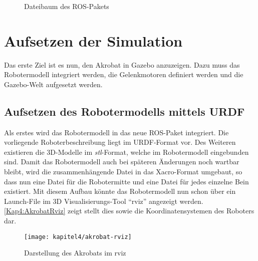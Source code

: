 \begin{figure}[p!]
\caption{Dateibaum des ROS-Pakets}
\label{Kap4:ROSPackageFolderStructure}
\end{figure}

\section{Aufsetzen der Simulation}

Das erste Ziel ist es nun, den Akrobat in Gazebo anzuzeigen. Dazu muss das Robotermodell integriert werden, die Gelenkmotoren definiert werden und die Gazebo-Welt aufgesetzt werden.

\subsection{Aufsetzen des Robotermodells mittels URDF}

Als erstes wird das Robotermodell in das neue \ac{ROS}-Paket integriert. Die vorliegende Roboterbeschreibung liegt im \ac{URDF}-Format vor. Des Weiteren existieren die 3D-Modelle im \emph{stl}-Format, welche im Robotermodell eingebunden sind. Damit das Robotermodell auch bei späteren Änderungen noch wartbar bleibt, wird die zusammenhängende Datei in das \ac{Xacro}-Format umgebaut, so dass nun eine Datei für die Robotermitte und eine Datei für jedes einzelne Bein existiert. Mit diesem Aufbau könnte das Robotermodell nun schon über ein Launch-File im 3D Visualisierungs-Tool "`rviz"' angezeigt werden. \autoref{Kap4:AkrobatRviz} zeigt stellt dies sowie die Koordinatensystemen des Roboters dar.

\begin{figure}[b!]
  \centering
  \texttt{[image: kapitel4/akrobat-rviz]}
  \caption{Darstellung des Akrobats im rviz}
  \label{Kap4:AkrobatRviz}
\end{figure}

